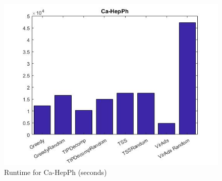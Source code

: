 \begin{figure}
	\centering	
	\includegraphics[scale=0.5]{images/hepphtime.jpg}
	\caption{Runtime for Ca-HepPh (seconds)}
\end{figure}

